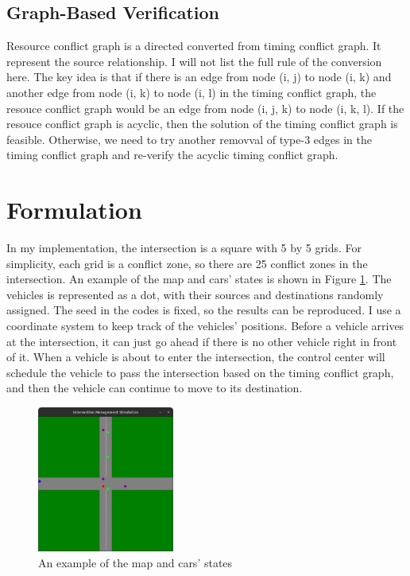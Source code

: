 \documentclass{article}
\begin{document}
\begin{multicols*}{2}
    \subsection{Graph-Based Verification}
    Resource conflict graph is a directed converted from timing conflict graph. It represent the source relationship. I will not list the full rule of the conversion here. The key idea is that if there is an edge from node (i, j) to node (i, k) and another edge from node (i, k) to node (i, l) in the timing conflict graph, the resouce conflict graph would be an edge from node (i, j, k) to node (i, k, l). If the resouce conflict graph is acyclic, then the solution of the timing conflict graph is feasible. Otherwise, we need to try another removval of type-3 edges in the timing conflict graph and re-verify the acyclic timing conflict graph.

    \section{Formulation}
    In my implementation, the intersection is a square with 5 by 5 grids. For simplicity, each grid is a conflict zone, so there are 25 conflict zones in the intersection. An example of the map and cars' states is shown in Figure \ref{fig:map}. The vehicles is represented as a dot, with their sources and destinations randomly assigned. The seed in the codes is fixed, so the results can be reproduced. I use a coordinate system to keep track of the vehicles' positions. Before a vehicle arrives at the intersection, it can just go ahead if there is no other vehicle right in front of it. When a vehicle is about to enter the intersection, the control center will schedule the vehicle to pass the intersection based on the timing conflict graph, and then the vehicle can continue to move to its destination.
    \begin{figure}[H]
        \centering
        \includegraphics[width=0.4\textwidth]{images/map.png}
        \caption{An example of the map and cars' states}
        \label{fig:map}
    \end{figure}


\end{multicols*}
\end{document}
